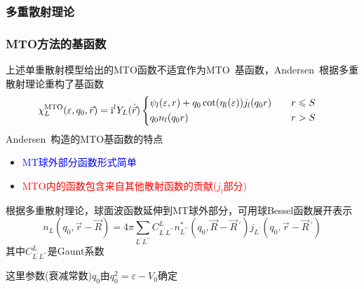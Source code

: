 \documentclass[cjk,slidestop,compress,mathserif,blue]{beamer}
\begin{document}
\frame
{
	\frametitle{多重散射理论}
\begin{figure}[h!]
	\vspace{-5pt}
\centering
{}
\label{Multiple_scattering}
\end{figure}
}

\frame
{
\frametitle{\textrm{MTO}方法的基函数}
%
上述单重散射模型给出的\textrm{MTO}函数不适宜作为\textrm{MTO~}基函数，\textrm{Andersen~}根据多重散射理论重构了基函数
		\begin{displaymath}
			\hspace*{-10pt}\chi_L^{\mathrm{MTO}}(\varepsilon,q_0,\vec r)=\mathrm{i}^lY_L(\hat{\vec r})\left\{
			\begin{aligned}
				&\psi_l(\varepsilon,r)+q_0\cot(\eta_l(\varepsilon))j_l(q_0r)&\quad r\leqslant S\\
				&q_0n_l(q_0r)&\quad r>S
			\end{aligned}\right.
		\end{displaymath}
		\textrm{Andersen~}构造的\textrm{MTO}基函数的特点
		\begin{itemize}
			\item \textcolor{blue}{\textrm{MT}球外部分函数形式简单}
			\item \textcolor{red}{\textrm{MTO}内的函数包含来自其他散射函数的贡献($j_l$部分)}
		\end{itemize}
		根据多重散射理论，球面波函数延伸到\textrm{MT}球外部分，可用球\textrm{Bessel}函数展开表示
		\begin{displaymath}
			n_L(q_0,\vec r-\vec R)=4\pi\sum_{L^{\prime}L^{\prime\prime}}C_{L^{\prime}L^{\prime\prime}}^Ln_{L^{\prime\prime}}^{\ast}(q_0,\vec R-\vec R\,^{\prime})j_{L^{\prime}}(q_0,\vec r-\vec R\,^{\prime})
		\end{displaymath}
		其中$C_{L^{\prime}L^{\prime\prime}}^L$是\textrm{Gaunt}系数


		这里参数(衰减常数)$q_0$由$q_0^2=\varepsilon-V_0$确定
}
\end{document}

